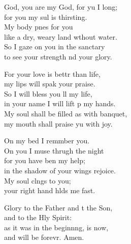 \settowidth{\versewidth}{My soul shall be filled as with a banquet, *}
\begin{psalmverse}%
  \begin{patverse}
     God, you are my God, for yu I long;\Med\\
for you my sul is thirsting.\\
My body p\pointup{\i}nes for you\Med\\
like a dry, weary land wthout water.\\
So I gaze on you in the sanctary\Med\\
to see your strength nd your glory.

For your love is bettr than life,\Med\\
my lips will spak your praise.\\
So I will bless you ll my life,\Med\\
in your name I will lift p my hands.\\
My soul shall be filled as with  banquet,\Med\\
my mouth shall praise yu with joy.

On my bed I remmber you.\Med\\
On you I muse thrugh the night\\
for you have ben my help;\Med\\
in the shadow of your wings  rejoice.\\
My soul cl\pointup{\i}ngs to you;\Med\\
your right hand hlds me fast.

Glory to the Father and t the Son,\Med\\
and to the Hly Spirit:\\
as it was in the beginn\pointup{\i}ng, is now,\Med\\
and will be forevr. Amen.
  \end{patverse}
\end{psalmverse}
